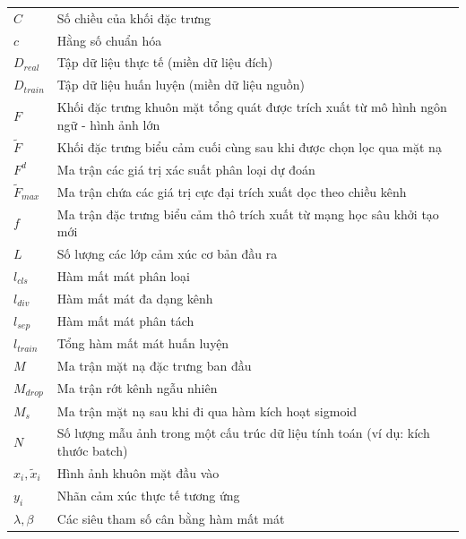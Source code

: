 \begin{longtable}{p{3.5cm} p{11.5cm}}
$C$ & Số chiều của khối đặc trưng \\
$c$ & Hằng số chuẩn hóa \\
$D_{real}$ & Tập dữ liệu thực tế (miền dữ liệu đích) \\
$D_{train}$ & Tập dữ liệu huấn luyện (miền dữ liệu nguồn) \\
$F$ & Khối đặc trưng khuôn mặt tổng quát được trích xuất từ mô hình ngôn ngữ - hình ảnh lớn \\
$\tilde{F}$ & Khối đặc trưng biểu cảm cuối cùng sau khi được chọn lọc qua mặt nạ \\
$F^d$ & Ma trận các giá trị xác suất phân loại dự đoán \\
$\tilde{F}_{max}$ & Ma trận chứa các giá trị cực đại trích xuất dọc theo chiều kênh \\
$f$ & Ma trận đặc trưng biểu cảm thô trích xuất từ mạng học sâu khởi tạo mới \\
$L$ & Số lượng các lớp cảm xúc cơ bản đầu ra \\
$l_{cls}$ & Hàm mất mát phân loại \\
$l_{div}$ & Hàm mất mát đa dạng kênh \\
$l_{sep}$ & Hàm mất mát phân tách \\
$l_{train}$ & Tổng hàm mất mát huấn luyện \\
$M$ & Ma trận mặt nạ đặc trưng ban đầu \\
$M_{drop}$ & Ma trận rớt kênh ngẫu nhiên \\
$M_s$ & Ma trận mặt nạ sau khi đi qua hàm kích hoạt sigmoid \\
$N$ & Số lượng mẫu ảnh trong một cấu trúc dữ liệu tính toán (ví dụ: kích thước batch) \\
$x_i, \tilde{x}_i$ & Hình ảnh khuôn mặt đầu vào \\
$y_i$ & Nhãn cảm xúc thực tế tương ứng \\
$\lambda, \beta$ & Các siêu tham số cân bằng hàm mất mát \\

\end{longtable}

\renewcommand{\arraystretch}{1.0}